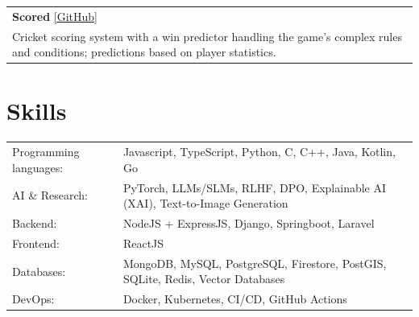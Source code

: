 \documentclass[a4paper,9pt]{extarticle}
\begin{document}
\begin{tabularx}{\linewidth}{ @{}X@{} }
\textbf{Scored} \hfill \href{https://github.com/saad1551/cricketScoreboard}{[GitHub]} \\
Cricket scoring system with a win predictor handling the game's complex rules and conditions; predictions based on player statistics. \\[0pt]













\end{tabularx}



\section{Skills}
\begin{tabularx}{\linewidth}{@{}l X@{}}
Programming languages: &  \normalsize{Javascript, TypeScript, Python, C, C++, Java, Kotlin, Go} \\
AI \& Research:  &  \normalsize{PyTorch, LLMs/SLMs, RLHF, DPO, Explainable AI (XAI), Text-to-Image Generation} \\
Backend: &  \normalsize{NodeJS + ExpressJS, Django, Springboot, Laravel} \\
Frontend:  &  \normalsize{ReactJS} \\
Databases:  &  \normalsize{MongoDB, MySQL, PostgreSQL, Firestore, PostGIS, SQLite, Redis, Vector Databases} \\
DevOps:  &  \normalsize{Docker, Kubernetes, CI/CD, GitHub Actions} \\
\end{tabularx}
\end{document}
